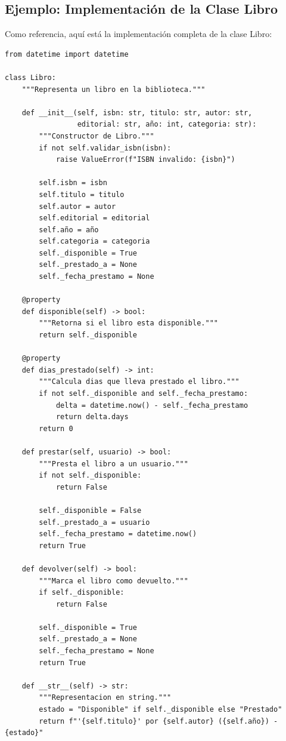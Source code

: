 \documentclass[11pt,letterpaper]{article}
\begin{document}
\subsection{Ejemplo: Implementación de la Clase Libro}

Como referencia, aquí está la implementación completa de la clase Libro:

\begin{lstlisting}[caption={Ejemplo: Clase Libro completa}]
from datetime import datetime

class Libro:
    """Representa un libro en la biblioteca."""
    
    def __init__(self, isbn: str, titulo: str, autor: str,
                 editorial: str, año: int, categoria: str):
        """Constructor de Libro."""
        if not self.validar_isbn(isbn):
            raise ValueError(f"ISBN invalido: {isbn}")
        
        self.isbn = isbn
        self.titulo = titulo
        self.autor = autor
        self.editorial = editorial
        self.año = año
        self.categoria = categoria
        self._disponible = True
        self._prestado_a = None
        self._fecha_prestamo = None
    
    @property
    def disponible(self) -> bool:
        """Retorna si el libro esta disponible."""
        return self._disponible
    
    @property
    def dias_prestado(self) -> int:
        """Calcula dias que lleva prestado el libro."""
        if not self._disponible and self._fecha_prestamo:
            delta = datetime.now() - self._fecha_prestamo
            return delta.days
        return 0
    
    def prestar(self, usuario) -> bool:
        """Presta el libro a un usuario."""
        if not self._disponible:
            return False
        
        self._disponible = False
        self._prestado_a = usuario
        self._fecha_prestamo = datetime.now()
        return True
    
    def devolver(self) -> bool:
        """Marca el libro como devuelto."""
        if self._disponible:
            return False
        
        self._disponible = True
        self._prestado_a = None
        self._fecha_prestamo = None
        return True
    
    def __str__(self) -> str:
        """Representacion en string."""
        estado = "Disponible" if self._disponible else "Prestado"
        return f"'{self.titulo}' por {self.autor} ({self.año}) - {estado}"
    

\end{lstlisting}
\end{document}
